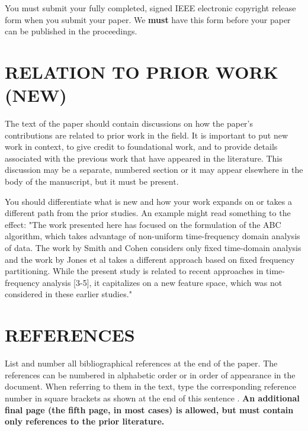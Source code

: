 \documentclass{article}
\begin{document}
You must submit your fully completed, signed IEEE electronic copyright release
form when you submit your paper. We {\bf must} have this form before your paper
can be published in the proceedings.

\section{RELATION TO PRIOR WORK (NEW)}
\label{sec:prior}

The text of the paper should contain discussions on how the paper's
contributions are related to prior work in the field. It is important
to put new work in  context, to give credit to foundational work, and
to provide details associated with the previous work that have appeared
in the literature. This discussion may be a separate, numbered section
or it may appear elsewhere in the body of the manuscript, but it must
be present.

You should differentiate what is new and how your work expands on
or takes a different path from the prior studies. An example might
read something to the effect: "The work presented here has focused
on the formulation of the ABC algorithm, which takes advantage of
non-uniform time-frequency domain analysis of data. The work by
Smith and Cohen \cite{Lamp86} considers only fixed time-domain analysis and
the work by Jones et al \cite{C2} takes a different approach based on
fixed frequency partitioning. While the present study is related
to recent approaches in time-frequency analysis [3-5], it capitalizes
on a new feature space, which was not considered in these earlier
studies."

\vfill\pagebreak

\section{REFERENCES}
\label{sec:refs}

List and number all bibliographical references at the end of the
paper. The references can be numbered in alphabetic order or in
order of appearance in the document. When referring to them in the
text, type the corresponding reference number in square brackets
as shown at the end of this sentence \cite{C2}. \textbf{An
additional final page (the fifth page, in most cases) is allowed,
but must contain only references to the prior literature.}



\end{document}
